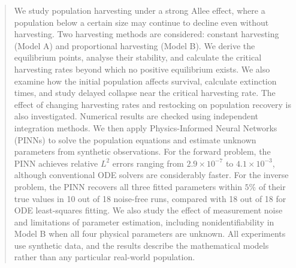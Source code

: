 
\begin{abstract}
We study population harvesting under a strong Allee effect,
where a population below a certain size may continue to
decline even without harvesting. Two harvesting methods
are considered: constant harvesting (Model A) and
proportional harvesting (Model B). We derive the equilibrium
points, analyse their stability, and calculate the critical
harvesting rates beyond which no positive equilibrium exists.
We also examine how the initial population affects survival,
calculate extinction times, and study delayed collapse near
the critical harvesting rate. The effect of changing
harvesting rates and restocking on population recovery is
also investigated. Numerical results are checked using
independent integration methods. We then apply
Physics-Informed Neural Networks (PINNs) to solve the
population equations and estimate unknown parameters from
synthetic observations. For the forward problem, the PINN
achieves relative $L^2$ errors ranging from
$2.9\times10^{-7}$ to $4.1\times10^{-3}$, although
conventional ODE solvers are considerably faster. For the
inverse problem, the PINN recovers all three fitted parameters
within $5\%$ of their true values in 10 out of 18
noise-free runs, compared with 18 out of 18 for ODE
least-squares fitting. We also study the effect of
measurement noise and limitations of parameter estimation,
including nonidentifiability in Model B when all four
physical parameters are unknown. All experiments use
synthetic data, and the results describe the mathematical
models rather than any particular real-world population.
\end{abstract}
